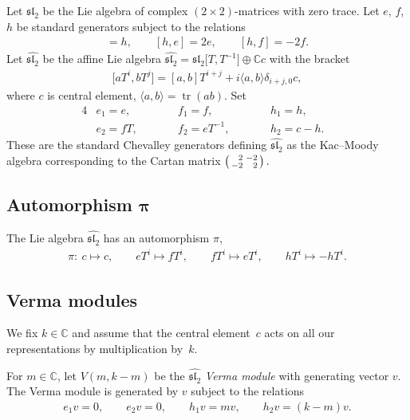\documentclass[11pt]{article}
\numberwithin{equation}{section}
\begin{document}
Let $\mathfrak{sl}_2$ be the Lie algebra of complex $(2\times 2)$-matrices with zero trace. Let $e$, $f$, $h$ be standard generators subject to the relations
\begin{gather*}
[e,f]=h,\qquad [h,e]=2e,\qquad [h,f]=-2f.
\end{gather*}
Let $\widehat{{\mathfrak{sl}_2}}$ be the affine Lie algebra $\widehat{{\mathfrak{sl}_2}}=\mathfrak{sl}_2\big[T,T^{-1}\big]\oplus{\mathbb C} c$ with the bracket
\begin{gather*}
\big[aT^i,bT^j\big] = [a,b]T^{i+j} + i \langle a,b\rangle \delta_{i+j,0} c ,
\end{gather*}
where $c$ is central element, $\langle a,b\rangle=\operatorname{tr} (ab)$. Set
\begin{alignat*}{4}
&e_1 = e, \qquad && f_1 = f, \qquad && h_1=h,& \\
& e_2 = fT, \qquad && f_2=eT^{-1}, \qquad && h_2=c-h.&
\end{alignat*}
These are the standard Chevalley generators defining $\widehat{{\mathfrak{sl}_2}}$ as the Kac--Moody algebra correspon\-ding to the Cartan matrix
$\left(\begin{smallmatrix} \hphantom{-}2&-2 \\
-2&\hphantom{-}2 \end{smallmatrix}\right).$

\subsection[Automorphism $\pi$]{Automorphism $\boldsymbol{\pi}$} \label{aut}
The Lie algebra $\widehat{{\mathfrak{sl}_2}}$ has an automorphism $\pi$,
\begin{gather*}
\pi \colon \ c \mapsto c, \qquad eT^i \mapsto fT^i, \qquad fT^i\mapsto eT^i, \qquad hT^i\mapsto -hT^i.
\end{gather*}

\subsection{Verma modules} \label{Ver mod}
We fix $k\in{\mathbb C}$ and assume that the central element~$c$ acts on all our representations by multiplication by~$k$.

For $m\in{\mathbb C}$, let $V(m,k-m)$ be the $\widehat{{\mathfrak{sl}_2}}$ {\em Verma module} with generating vector $v$. The Verma module is generated by $v$ subject to the relations
\begin{gather*}
e_1v=0,\qquad e_2v=0,\qquad h_1v=mv,\qquad h_2v=(k-m)v.
\end{gather*}
\end{document}
